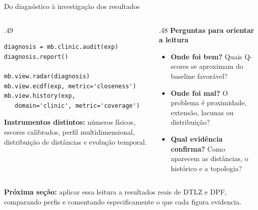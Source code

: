 \begin{frame}[fragile]{Do diagnóstico à investigação dos resultados}
\begin{columns}[T,onlytextwidth]
\begin{column}{.49\textwidth}
\begin{lstlisting}[style=python,basicstyle=\ttfamily\fontsize{7.8}{10}\selectfont]
diagnosis = mb.clinic.audit(exp)
diagnosis.report()

mb.view.radar(diagnosis)
mb.view.ecdf(exp, metric='closeness')
mb.view.history(exp,
   domain='clinic', metric='coverage')
\end{lstlisting}
\par\medskip
\textbf{Instrumentos distintos:} números físicos, escores calibrados, perfil multidimensional, distribuição de distâncias e evolução temporal.
\end{column}
\begin{column}{.48\textwidth}
\textbf{Perguntas para orientar a leitura}\par\smallskip
\begin{itemize}
\item \textbf{Onde foi bem?} Quais Q-scores se aproximam do baseline favorável?
\item \textbf{Onde foi mal?} O problema é proximidade, extensão, lacunas ou distribuição?
\item \textbf{Qual evidência confirma?} Como aparecem as distâncias, o histórico e a topologia?
\end{itemize}
\end{column}
\end{columns}
\vspace{.17cm}
\textbf{Próxima seção:} aplicar essa leitura a resultados reais de DTLZ e DPF, comparando perfis e comentando especificamente o que cada figura evidencia.
\end{frame}